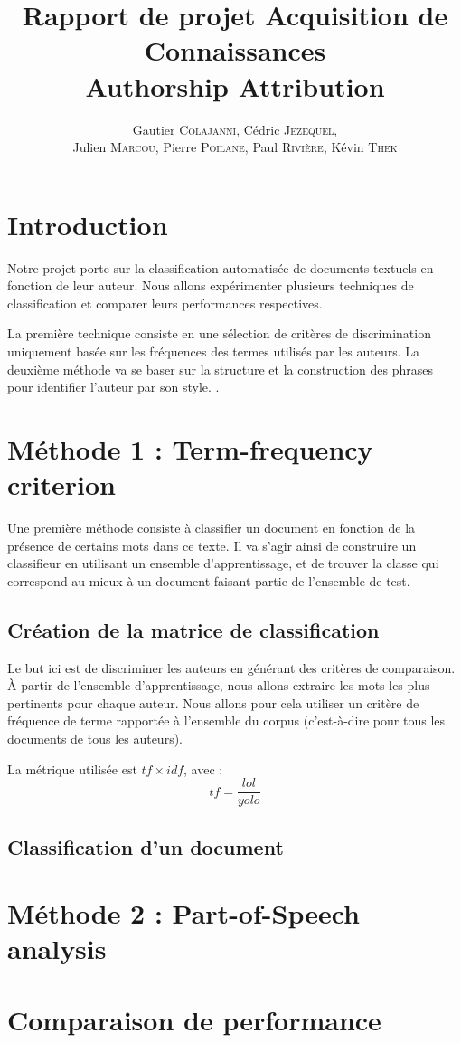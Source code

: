 \documentclass[a4paper]{article}
\author{Gautier \textsc{Colajanni}, Cédric \textsc{Jezequel},\\ Julien \textsc{Marcou}, Pierre \textsc{Poilane}, Paul \textsc{Rivière}, Kévin \textsc{Thek}}
\title{Rapport de projet Acquisition de Connaissances \\ Authorship Attribution}
\begin{document}
\maketitle

\section{Introduction}
Notre projet porte sur la classification automatisée de documents textuels en fonction de leur auteur. Nous allons expérimenter plusieurs techniques de classification et comparer leurs performances respectives.

La première technique consiste en une sélection de critères de discrimination uniquement basée sur les fréquences des termes utilisés par les auteurs. La deuxième méthode va se baser sur la structure et la construction des phrases pour identifier l'auteur par son style. .

\section{Méthode 1 : Term-frequency criterion}
Une première méthode consiste à classifier un document en fonction de la présence de certains mots dans ce texte. Il va s'agir ainsi de construire un classifieur en utilisant un ensemble d'apprentissage, et de trouver la classe qui correspond au mieux à un document faisant partie de l'ensemble de test.

\subsection{Création de la matrice de classification}
Le but ici est de discriminer les auteurs en générant des critères de comparaison. À partir de l'ensemble d'apprentissage, nous allons extraire les mots les plus pertinents pour chaque auteur. Nous allons pour cela utiliser un critère de fréquence de terme rapportée à l'ensemble du corpus (c'est-à-dire pour tous les documents de tous les auteurs).

La métrique utilisée est $tf \times idf$, avec : \[tf = \frac{lol}{yolo}\]

\subsection{Classification d'un document}

\section{Méthode 2 : Part-of-Speech analysis}

\section{Comparaison de performance}
\end{document}
